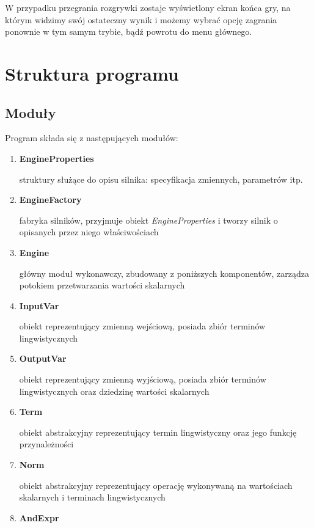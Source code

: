 \documentclass{article}
\begin{document}
W przypadku przegrania rozgrywki zostaje wyświetlony ekran końca gry, na którym widzimy swój
ostateczny wynik i możemy wybrać opcję zagrania ponownie w tym samym trybie, bądź powrotu
do menu głównego.

\section {Struktura programu}

\subsection {Moduły}

Program składa się z następujących modułów:

\begin{enumerate}
\item \textbf{EngineProperties}

  struktury służące do opisu silnika: specyfikacja zmiennych, parametrów itp.

\item \textbf{EngineFactory}

  fabryka silników, przyjmuje obiekt \emph{EngineProperties} i tworzy silnik o
  opisanych przez niego właściwościach

\item \textbf{Engine}

  główny moduł wykonawczy, zbudowany z poniższych komponentów, zarządza potokiem
  przetwarzania wartości skalarnych

\item \textbf{InputVar}

  obiekt reprezentujący zmienną wejściową, posiada zbiór terminów
  lingwistycznych

\item \textbf{OutputVar}

  obiekt reprezentujący zmienną wyjściową, posiada zbiór terminów
  lingwistycznych oraz dziedzinę wartości skalarnych

\item \textbf{Term}

  obiekt abstrakcyjny reprezentujący termin lingwistyczny oraz jego
  funkcję przynależności

\item \textbf{Norm}

  obiekt abstrakcyjny reprezentujący operację wykonywaną na wartościach
  skalarnych i terminach lingwistycznych

\item \textbf{AndExpr}


\end{enumerate}
\end{document}

